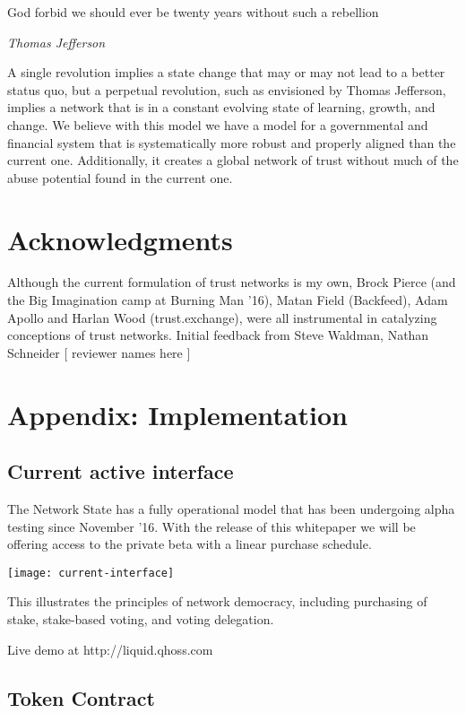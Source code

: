 \documentclass{article}
\begin{document}
\epigraph{ God forbid we should ever be twenty years without such a rebellion\cite{jefferson}  }{\textit{Thomas Jefferson}}

A single revolution implies a state change that may or may not lead to a better status quo, but a perpetual revolution, such as envisioned by Thomas Jefferson, implies a network that is in a constant evolving state of learning, growth, and change. We believe with this model we have a model for a governmental and financial system that is systematically more robust and properly aligned than the current one. Additionally, it creates a global network of trust without much of the abuse potential found in the current one.


\section {Acknowledgments}

Although the current formulation of trust networks is my own, Brock Pierce (and the Big Imagination camp at Burning Man '16), Matan Field (Backfeed), Adam Apollo and Harlan Wood (trust.exchange), were all instrumental in catalyzing conceptions of trust networks. Initial feedback from Steve Waldman, Nathan Schneider [ reviewer names here ]






\appendix

\section {Appendix: Implementation}

\subsection {Current active interface}

The Network State has a fully operational model that has been undergoing alpha testing since November '16. With the release of this whitepaper we will be offering access to the private beta with a linear purchase schedule.

\texttt{[image: current-interface]}

This illustrates the principles of network democracy, including purchasing of stake, stake-based voting, and voting delegation.

Live demo at http://liquid.qhoss.com

\subsection { Token Contract}
\end{document}
